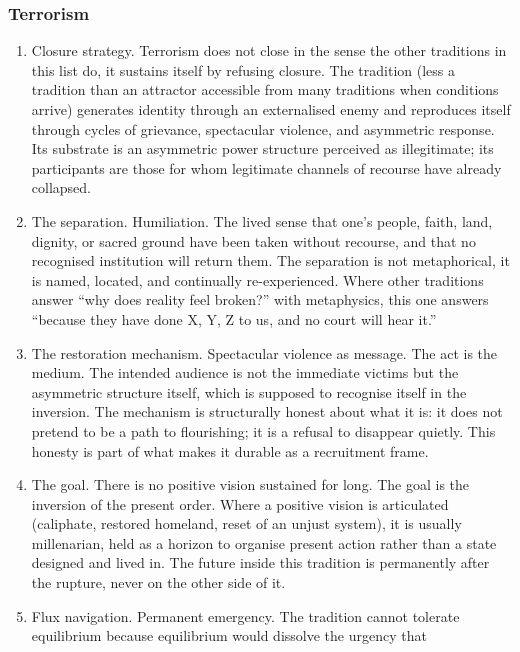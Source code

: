 \documentclass[
]{article}
\begin{document}
\subsubsection{Terrorism}\label{terrorism}

\begin{enumerate}
\def\labelenumi{\arabic{enumi}.}
\setcounter{enumi}{141}
\item
  Closure strategy. Terrorism does not close in the sense the other
  traditions in this list do, it sustains itself by refusing closure.
  The tradition (less a tradition than an attractor accessible from many
  traditions when conditions arrive) generates identity through an
  externalised enemy and reproduces itself through cycles of grievance,
  spectacular violence, and asymmetric response. Its substrate is an
  asymmetric power structure perceived as illegitimate; its participants
  are those for whom legitimate channels of recourse have already
  collapsed.
\item
  The separation. Humiliation. The lived sense that one's people, faith,
  land, dignity, or sacred ground have been taken without recourse, and
  that no recognised institution will return them. The separation is not
  metaphorical, it is named, located, and continually re-experienced.
  Where other traditions answer ``why does reality feel broken?'' with
  metaphysics, this one answers ``because they have done X, Y, Z to us,
  and no court will hear it.''
\item
  The restoration mechanism. Spectacular violence as message. The act is
  the medium. The intended audience is not the immediate victims but the
  asymmetric structure itself, which is supposed to recognise itself in
  the inversion. The mechanism is structurally honest about what it is:
  it does not pretend to be a path to flourishing; it is a refusal to
  disappear quietly. This honesty is part of what makes it durable as a
  recruitment frame.
\item
  The goal. There is no positive vision sustained for long. The goal is
  the inversion of the present order. Where a positive vision is
  articulated (caliphate, restored homeland, reset of an unjust system),
  it is usually millenarian, held as a horizon to organise present
  action rather than a state designed and lived in. The future inside
  this tradition is permanently after the rupture, never on the other
  side of it.
\item
  Flux navigation. Permanent emergency. The tradition cannot tolerate
  equilibrium because equilibrium would dissolve the urgency that

\end{enumerate}
\end{document}
